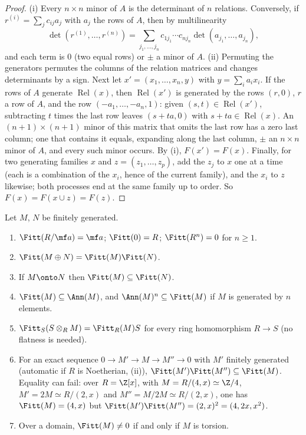 \begin{proof}
(i) Every $n\times n$ minor of $A$ is the determinant of $n$ relations. Conversely, if $r^{(i)}=\sum_jc_{ij}a_j$ with $a_j$ the rows of $A$, then by
multilinearity
\[\det(r^{(1)},\dots,r^{(n)})=\sum_{j_1,\dots,j_n}c_{1j_1}\cdots c_{nj_n}\det(a_{j_1},\dots,a_{j_n}),\]
and each term is $0$ (two equal rows) or $\pm$ a minor of $A$.
(ii) Permuting the generators permutes the columns of the relation matrices and changes determinants by a sign. Next let
$x'=(x_1,\dots,x_n,y)$ with $y=\sum_ia_ix_i$. If the rows of $A$ generate $\operatorname{Rel}(x)$, then $\operatorname{Rel}(x')$ is generated by the rows $(r,0)$, $r$ a row of
$A$, and the row $(-a_1,\dots,-a_n,1)$: given $(s,t)\in\operatorname{Rel}(x')$, subtracting $t$ times the last row leaves $(s+ta,0)$ with $s+ta\in\operatorname{Rel}(x)$. An
$(n+1)\times(n+1)$ minor of this matrix that omits the last row has a zero last column; one that contains it equals, expanding along the
last column, $\pm$ an $n\times n$ minor of $A$, and every such minor occurs. By (i), $F(x')=F(x)$. Finally, for two generating families $x$
and $z=(z_1,\dots,z_p)$, add the $z_j$ to $x$ one at a time (each is a combination of the $x_i$, hence of the current family), and the $x_i$
to $z$ likewise; both processes end at the same family up to order. So $F(x)=F(x\cup z)=F(z)$.
\end{proof}

\begin{proposition}\label{prop:modules:fitting-properties}
Let $M$, $N$ be finitely generated.
\begin{enumerate}[label=(\roman*)]
\item $\Fitt(R/\mf a)=\mf a$; $\Fitt(0)=R$; $\Fitt(R^n)=0$ for $n\ge1$.
\item $\Fitt(M\oplus N)=\Fitt(M)\Fitt(N)$.
\item If $M\onto N$ then $\Fitt(M)\subseteq\Fitt(N)$.
\item $\Fitt(M)\subseteq\Ann(M)$, and $\Ann(M)^n\subseteq\Fitt(M)$ if $M$ is generated by $n$ elements.
\item $\Fitt_S(S\otimes_RM)=\Fitt_R(M)S$ for every ring homomorphism $R\to S$ (no flatness is needed).
\item For an exact sequence $0\to M'\to M\to M''\to0$ with $M'$ finitely generated (automatic if $R$ is Noetherian,
(ii)), $\Fitt(M')\Fitt(M'')\subseteq\Fitt(M)$. Equality can fail: over $R=\Z[x]$, with $M=R/(4,x)\simeq\Z/4$,
$M'=2M\simeq R/(2,x)$ and $M''=M/2M\simeq R/(2,x)$, one has $\Fitt(M)=(4,x)$ but $\Fitt(M')\Fitt(M'')=(2,x)^2=(4,2x,x^2)$.
\item Over a domain, $\Fitt(M)\ne0$ if and only if $M$ is torsion.
\end{enumerate}
\end{proposition}

